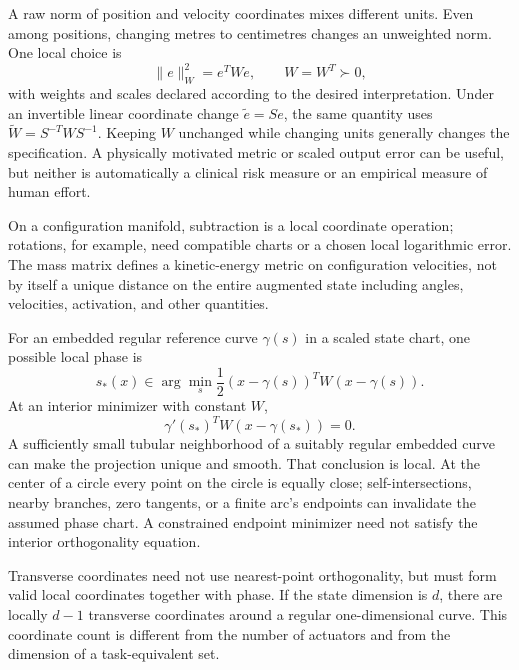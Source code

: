 \documentclass[12pt, openany]{book}
\theoremstyle{plain}
\begin{document}
A raw norm of position and velocity coordinates mixes different units. Even
among positions, changing metres to centimetres changes an unweighted norm.
One local choice is
\begin{equation}
 \|e\|_W^2=e^TWe,\qquad W=W^T\succ0,
 \label{eq:motion_metric}
\end{equation}
with weights and scales declared according to the desired interpretation.
Under an invertible linear coordinate change $\widetilde e=Se$, the same
quantity uses $\widetilde W=S^{-T}WS^{-1}$. Keeping $W$ unchanged while changing
units generally changes the specification. A physically motivated metric or
scaled output error can be useful, but neither is automatically a clinical
risk measure or an empirical measure of human effort.

On a configuration manifold, subtraction is a local coordinate operation;
rotations, for example, need compatible charts or a chosen local logarithmic
error. The mass matrix defines a kinetic-energy metric on configuration
velocities, not by itself a unique distance on the entire augmented state
including angles, velocities, activation, and other quantities.

For an embedded regular reference curve $\gamma(s)$ in a scaled state chart,
one possible local phase is
\begin{equation}
 s_*(x)\in\arg\min_s\frac12(x-\gamma(s))^TW(x-\gamma(s)).
 \label{eq:motion_projection_phase}
\end{equation}
At an interior minimizer with constant $W$,
\begin{equation}
 \gamma'(s_*)^TW(x-\gamma(s_*))=0.
 \label{eq:motion_phase_orthogonality}
\end{equation}
A sufficiently small tubular neighborhood of a suitably regular embedded curve
can make the projection unique and smooth. That conclusion is local. At the
center of a circle every point on the circle is equally close; self-intersections,
nearby branches, zero tangents, or a finite arc's endpoints can invalidate the
assumed phase chart. A constrained endpoint minimizer need not satisfy the
interior orthogonality equation.

Transverse coordinates need not use nearest-point orthogonality, but must form
valid local coordinates together with phase. If the state dimension is $d$,
there are locally $d-1$ transverse coordinates around a regular one-dimensional
curve. This coordinate count is different from the number of actuators and
from the dimension of a task-equivalent set.
\end{document}
